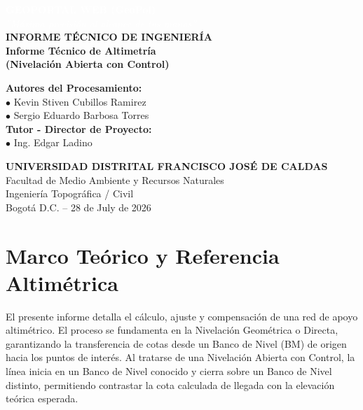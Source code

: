 \documentclass[11pt,letterpaper]{article}
\begin{document}
\begin{titlepage}
\vspace*{-2cm}
\begin{center}
  \textcolor{white}{\Huge \textbf{GEOPORTAL WEB (GeoPol)}} \\[0.5cm]
  \textcolor{white}{\large \textit{''Máxima precisión al alcance de tus manos''}} \\[2cm]
  \vspace{3cm}
  {\LARGE \textbf{INFORME TÉCNICO DE INGENIERÍA}} \\[0.5cm]
  {\Large \textbf{Informe Técnico de Altimetría\\ (Nivelación Abierta con Control)}} \\[2cm]
  \begin{flushleft}
    \Large \textbf{Autores del Procesamiento:}\\[0.2cm]
    \large $\bullet$ Kevin Stiven Cubillos Ramirez \\[0.1cm]
    \large $\bullet$ Sergio Eduardo Barbosa Torres \\[0.1cm]
    \vspace{1cm}
    \Large \textbf{Tutor - Director de Proyecto:}\\[0.2cm]
    \large $\bullet$ Ing. Edgar Ladino
  \end{flushleft}
  \vfill
  \textbf{UNIVERSIDAD DISTRITAL FRANCISCO JOSÉ DE CALDAS}\\[0.2cm]
  Facultad de Medio Ambiente y Recursos Naturales \\ Ingeniería Topográfica / Civil \\[0.2cm]
  Bogotá D.C. -- 28 de July de 2026
\end{center}
\end{titlepage}
\tableofcontents
\newpage
\section{Marco Teórico y Referencia Altimétrica}
El presente informe detalla el cálculo, ajuste y compensación de una red de apoyo altimétrico. El proceso se fundamenta en la Nivelación Geométrica o Directa, garantizando la transferencia de cotas desde un Banco de Nivel (BM) de origen hacia los puntos de interés.
Al tratarse de una Nivelación Abierta con Control, la línea inicia en un Banco de Nivel conocido y cierra sobre un Banco de Nivel distinto, permitiendo contrastar la cota calculada de llegada con la elevación teórica esperada.
\end{document}
